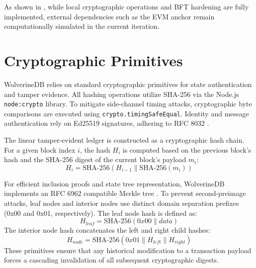 As shown in , while local cryptographic operations and BFT hardening are fully implemented, external dependencies such as the EVM anchor remain computationally simulated in the current iteration.

\section{Cryptographic Primitives}\label{sec:wdb-crypto}
WolverineDB relies on standard cryptographic primitives for state authentication and tamper evidence. All hashing operations utilize SHA-256 via the Node.js \texttt{node:crypto} library. To mitigate side-channel timing attacks, cryptographic byte comparisons are executed using \texttt{crypto.timingSafeEqual}. Identity and message authentication rely on Ed25519 signatures, adhering to RFC 8032 \cite{rfc8032}.

The linear tamper-evident ledger is constructed as a cryptographic hash chain. For a given block index $i$, the hash $H_i$ is computed based on the previous block's hash and the SHA-256 digest of the current block's payload $m_i$:
\begin{equation}
H_i = \text{SHA-256}(H_{i-1} \parallel \text{SHA-256}(m_i))
\label{eq:wdb-hash-chain}
\end{equation}

For efficient inclusion proofs and state tree representation, WolverineDB implements an RFC 6962 \cite{rfc6962} compatible Merkle tree \cite{merkle1987digital}. To prevent second-preimage attacks, leaf nodes and interior nodes use distinct domain separation prefixes (0x00 and 0x01, respectively).
The leaf node hash is defined as:
\begin{equation}
H_{leaf} = \text{SHA-256}(0x00 \parallel data)
\label{eq:wdb-merkle-leaf}
\end{equation}
The interior node hash concatenates the left and right child hashes:
\begin{equation}
H_{node} = \text{SHA-256}(0x01 \parallel H_{left} \parallel H_{right})
\label{eq:wdb-merkle-node}
\end{equation}
These primitives ensure that any historical modification to a transaction payload forces a cascading invalidation of all subsequent cryptographic digests.

